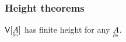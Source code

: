 \documentclass{article}
\newcommand{\expope}[2]{#1 \Rightarrow #2}
\newcommand{\lrof}[1]{\ms{T}[#1]}
\newcommand{\Val}[1]{\ms{V}[#1]}
\begin{document}







\subsubsection{Height theorems}
\begin{theorem}\label{thm:finite-height}
  $\Val{\fineq{A}}$ has finite height for any $\fineq{A}$.
\end{theorem}
\end{document}
